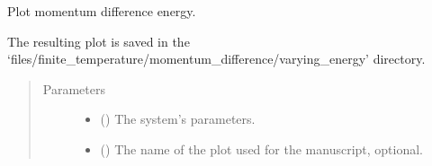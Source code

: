 \documentclass[letterpaper,10pt,english]{sphinxmanual}
\begin{document}
\begin{fulllineitems}
\label{\detokenize{modules:modules.utils.plot_momentum_difference_vs_energy}}
\pysigstartsignatures
{}
\pysigstopsignatures
\sphinxAtStartPar
Plot momentum difference  energy.

\sphinxAtStartPar
The resulting plot is saved in the ‘files/finite\_temperature/momentum\_difference/varying\_energy’ directory.
\begin{quote}\begin{description}
\item[{Parameters}] \leavevmode\begin{itemize}
\item {} 
\sphinxAtStartPar
{} () \textendash{} The system’s parameters.

\item {} 
\sphinxAtStartPar
{} () \textendash{} The name of the plot used for the manuscript, optional.

\end{itemize}

\end{description}\end{quote}

\end{fulllineitems}

\end{document}
